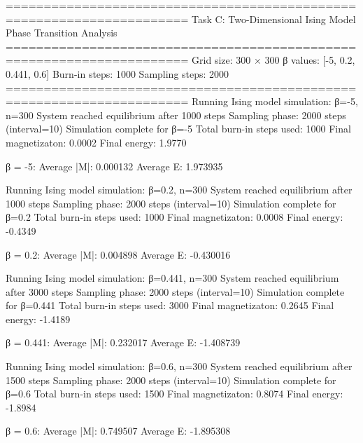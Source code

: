 \documentclass[11pt]{article}
\newenvironment{Shaded}{}{}
\newcommand{\NormalTok}[1]{{#1}}
\begin{document}
\begin{Shaded}
\begin{Highlighting}[]
\NormalTok{======================================================================}
\NormalTok{Task C: Two{-}Dimensional Ising Model Phase Transition Analysis}
\NormalTok{======================================================================}
\NormalTok{Grid size: 300 × 300}
\NormalTok{β values: [{-}5, 0.2, 0.441, 0.6]}
\NormalTok{Burn{-}in steps: 1000}
\NormalTok{Sampling steps: 2000}
\NormalTok{======================================================================}
\NormalTok{Running Ising model simulation: β={-}5, n=300}
\NormalTok{  System reached equilibrium after 1000 steps}
\NormalTok{  Sampling phase: 2000 steps (interval=10)}
\NormalTok{Simulation complete for β={-}5}
\NormalTok{  Total burn{-}in steps used: 1000}
\NormalTok{  Final magnetizaton: 0.0002}
\NormalTok{  Final energy: 1.9770}

\NormalTok{β = {-}5:}
\NormalTok{  Average |M|: 0.000132}
\NormalTok{  Average E:  1.973935}

\NormalTok{Running Ising model simulation: β=0.2, n=300}
\NormalTok{  System reached equilibrium after 1000 steps}
\NormalTok{  Sampling phase: 2000 steps (interval=10)}
\NormalTok{Simulation complete for β=0.2}
\NormalTok{  Total burn{-}in steps used: 1000}
\NormalTok{  Final magnetizaton: 0.0008}
\NormalTok{  Final energy: {-}0.4349}

\NormalTok{β = 0.2:}
\NormalTok{  Average |M|: 0.004898}
\NormalTok{  Average E:  {-}0.430016}

\NormalTok{Running Ising model simulation: β=0.441, n=300}
\NormalTok{  System reached equilibrium after 3000 steps}
\NormalTok{  Sampling phase: 2000 steps (interval=10)}
\NormalTok{Simulation complete for β=0.441}
\NormalTok{  Total burn{-}in steps used: 3000}
\NormalTok{  Final magnetizaton: 0.2645}
\NormalTok{  Final energy: {-}1.4189}

\NormalTok{β = 0.441:}
\NormalTok{  Average |M|: 0.232017}
\NormalTok{  Average E:  {-}1.408739}

\NormalTok{Running Ising model simulation: β=0.6, n=300}
\NormalTok{  System reached equilibrium after 1500 steps}
\NormalTok{  Sampling phase: 2000 steps (interval=10)}
\NormalTok{Simulation complete for β=0.6}
\NormalTok{  Total burn{-}in steps used: 1500}
\NormalTok{  Final magnetizaton: 0.8074}
\NormalTok{  Final energy: {-}1.8984}

\NormalTok{β = 0.6:}
\NormalTok{  Average |M|: 0.749507}
\NormalTok{  Average E:  {-}1.895308}
\end{Highlighting}
\end{Shaded}
\end{document}
